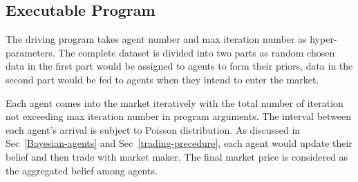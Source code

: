 \documentclass[12pt]{article}
\begin{document}
\subsection{Executable Program}\label{main-executable}
The driving program takes agent number and max iteration number as hyper-parameters. The complete dataset is divided into two parts as random chosen data in the first part would be assigned to agents to form their priors, data in the second part would be fed to agents when they intend to enter the market.

Each agent comes into the market iteratively with the total number of iteration not exceeding max iteration number in program arguments. The interval between each agent's arrival is subject to Poisson distribution.  %
As discussed in Sec~\ref{Bayesian-agents} and Sec~\ref{trading-precedure}, each agent would update their belief and then trade with market maker. The final market price is considered as the aggregated belief among agents.
\end{document}
